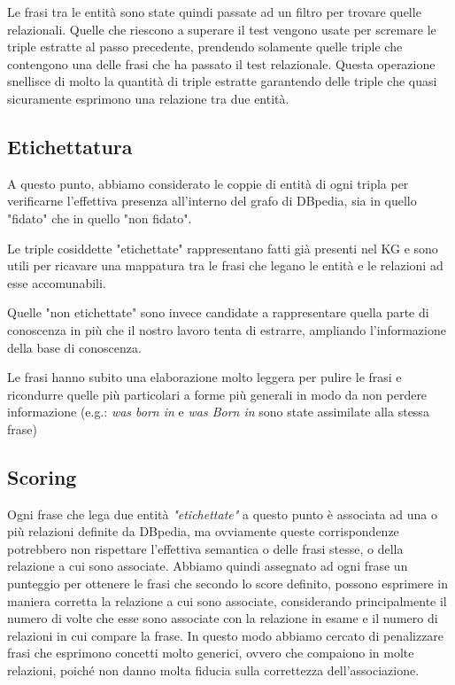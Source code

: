 \documentclass[10pt,a4paper,twocolumn]{article}
\begin{document}
Le frasi tra le entità sono state quindi passate ad un filtro per trovare quelle relazionali. Quelle che riescono a superare il test vengono usate per scremare le triple estratte al passo precedente, prendendo solamente quelle triple che contengono una delle frasi che ha passato il test relazionale. Questa operazione snellisce di molto la quantità di triple estratte garantendo delle triple che quasi sicuramente esprimono una relazione tra due entità.

\subsection{Etichettatura}
A questo punto, abbiamo considerato le coppie di entità di ogni tripla per verificarne l'effettiva presenza all'interno del grafo di DBpedia, sia in quello "fidato" che in quello "non fidato".

Le triple cosiddette "etichettate" rappresentano fatti già presenti nel KG e sono utili per ricavare una mappatura tra le frasi che legano le entità e le relazioni ad esse accomunabili.

Quelle "non etichettate" sono invece candidate a rappresentare quella parte di conoscenza in più che il nostro lavoro tenta di estrarre, ampliando l'informazione della base di conoscenza.

Le frasi hanno subito una elaborazione molto leggera per pulire le frasi e ricondurre quelle più particolari a forme più generali in modo da non perdere informazione (e.g.: \textit{was born in} e \textit{was Born in} sono state assimilate alla stessa frase)

\subsection{Scoring}

Ogni frase che lega due entità \textit{"etichettate"} a questo punto è associata ad una o più relazioni definite da DBpedia, ma ovviamente queste corrispondenze potrebbero non rispettare l'effettiva semantica o delle frasi stesse, o della relazione a cui sono associate. Abbiamo quindi assegnato ad ogni frase un punteggio per ottenere le frasi che secondo lo score definito, possono esprimere in maniera corretta la relazione a cui sono associate, considerando principalmente il numero di volte che esse sono associate con la relazione in esame e il numero di relazioni in cui compare la frase. In questo modo abbiamo cercato di penalizzare frasi che esprimono concetti molto generici, ovvero che compaiono in molte relazioni, poiché non danno molta fiducia sulla correttezza dell'associazione.
\end{document}
